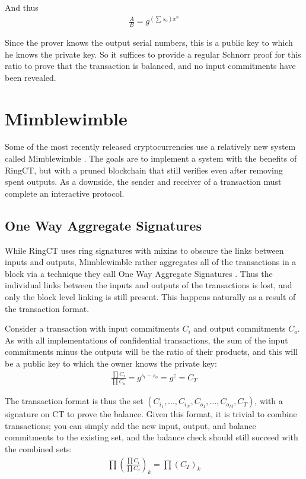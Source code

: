 \documentclass{article}
\begin{document}
And thus
\begin{align}
  \frac{A}{B} = g^{(\sum{s_o}) x^n}
\end{align}

Since the prover knows the output serial numbers, this is a public key to which he knows the private key.  So it suffices to provide a regular Schnorr proof for this ratio to prove that the transaction is balanced, and no input commitments have been revealed.



\section{Mimblewimble}

Some of the most recently released cryptocurrencies use a relatively new system called Mimblewimble \cite{mimblewimble}.  The goals are to implement a system with the benefits of RingCT, but with a pruned blockchain that still verifies even after removing spent outputs.  As a downside, the sender and receiver of a transaction must complete an interactive protocol.


\subsection{One Way Aggregate Signatures}

While RingCT uses ring signatures with mixins to obscure the links between inputs and outputs, Mimblewimble rather aggregates all of the transactions in a block via a technique they call One Way Aggregate Signatures \cite{increasingBitcoinAnonymity}.  Thus the individual links between the inputs and outputs of the transactions is lost, and only the block level linking is still present.  This happens naturally as a result of the transaction format.

Consider a transaction with input commitments $C_i$ and output commitments $C_o$.  As with all implementations of confidential transactions, the sum of the input commitments minus the outputs will be the ratio of their products, and this will be a public key to which the owner knows the private key:
\begin{align}
  \frac{\prod C_i}{\prod C_o} = g^{s_i - s_o} = g^z = C_T
\end{align}

The transaction format is thus the set $(C_{i_1}, ..., C_{i_N}, C_{o_1}, ..., C_{o_M}, C_T)$, with a signature on CT to prove the balance.  Given this format, it is trivial to combine transactions; you can simply add the new input, output, and balance commitments to the existing set, and the balance check should still succeed with the combined sets:
\begin{align}
  \prod (\frac{\prod C_i}{\prod C_o})_k= \prod (C_T)_k
\end{align}
\end{document}

